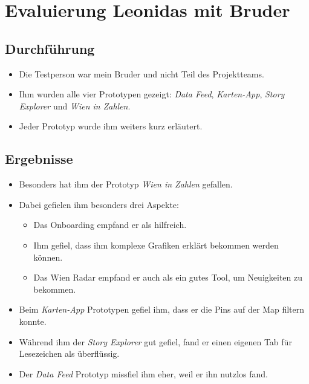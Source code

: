 \section{Evaluierung Leonidas mit Bruder}

\subsection{Durchführung}

\begin{itemize}
    \item Die Testperson war mein Bruder und nicht Teil des Projektteams.
    \item Ihm wurden alle vier Prototypen gezeigt: \textit{Data Feed}, \textit{Karten-App}, \textit{Story Explorer} und \textit{Wien in Zahlen}.
    \item Jeder Prototyp wurde ihm weiters kurz erläutert.
\end{itemize}

\subsection{Ergebnisse}

\begin{itemize}
    \item Besonders hat ihm der Prototyp \textit{Wien in Zahlen} gefallen.
    \item Dabei gefielen ihm besonders drei Aspekte:
    \begin{itemize}
        \item Das Onboarding empfand er als hilfreich.
        \item Ihm gefiel, dass ihm komplexe Grafiken erklärt bekommen werden können.
        \item Das Wien Radar empfand er auch als ein gutes Tool, um Neuigkeiten zu bekommen.
    \end{itemize}
    \item Beim \textit{Karten-App} Prototypen gefiel ihm, dass er die Pins auf der Map filtern konnte.
    \item Während ihm der \textit{Story Explorer} gut gefiel, fand er einen eigenen Tab für Lesezeichen als überflüssig.
    \item Der \textit{Data Feed} Prototyp missfiel ihm eher, weil er ihn nutzlos fand.
\end{itemize}